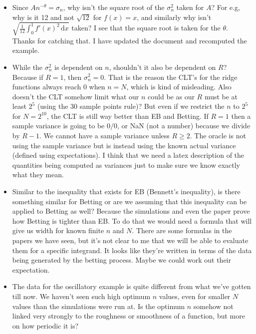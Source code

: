 \documentclass{amsart}
\renewcommand{\ge}{\geqslant}
\newcommand{\rd}{\,\mathrm{d}}
\newcommand{\art}[1]{{\color{blue}#1}}
\begin{document}
\begin{itemize}
\begin{itemize}
        \item Since $An^{-\theta} = \sigma_n$, why isn't the square root of the $\sigma^2_n$ taken for $A$? For e.g, why is it 12 and not $\sqrt{12}$ for $f(x) = x$, and similarly why isn't $\sqrt{\frac1{12}\int_0^1 f'(x)^2\rd x}$ taken? I see that the square root is taken for the $\theta$.
        \art{Thanks for catching that.  I have updated the document and recomputed the example.}
        \item While the $\sigma^2_n$  is dependent on $n$, shouldn't it also be dependent on $R$? Because if $R = 1$, then $\sigma^2_n = 0$. That is the reason the CLT's for the ridge functions always reach $0$ when $n = N$, which is kind of misleading. Also doesn't the CLT somehow limit what our $n$ could be as our $R$ must be at least $2^5$ (using the 30 sample points rule)? But even if we restrict the $n$ to $2^5$ for $N = 2^{10}$, the CLT is still way better than EB and Betting. \art{If $R=1$ then a sample variance is going to be $0/0$, or NaN (not a number) because we divide by $R-1$. We cannot have a sample variance unless $R\ge2$. The oracle is not using the sample variance but is instead using the known actual variance (defined using expectations). I think that we need a latex description of the quantities being computed as variances just to make sure we know exactly what they mean.}
        \item Similar to the inequality that exists for EB (Bennett’s inequality), is there something similar for Betting or are we assuming that this inequality can be applied to Betting as well? Because the simulations and even the paper prove how Betting is tighter than EB. 
        \art{To do that we would need a formula that will give us width for known finite $n$ and $N$. There are some formulas in the papers we have seen, but it's not clear to me that we will be able to evaluate them for a specific integrand.  It looks like they're written in terms of the data being generated by the betting process.  Maybe we could work out their expectation.}
        \item The data for the oscillatory example is quite different from what we've gotten till now. We haven't seen such high optimum $n$ values, even for smaller $N$ values than the simulations were run at. Is the optimum $n$ somehow not linked very strongly to the roughness or smoothness of a function, but more on how periodic it is? 

\end{itemize}
\end{itemize}
\end{document}
